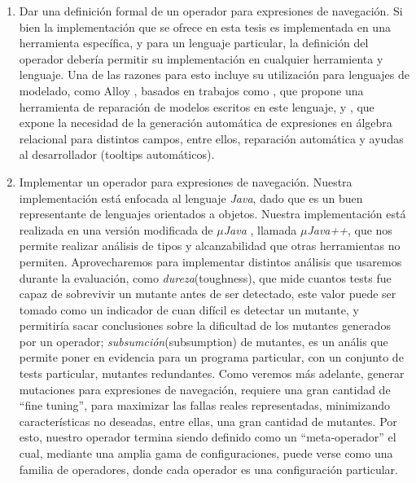 \begin{enumerate}
	\item Dar una definici\'on formal de un operador para expresiones de navegaci\'on. Si bien la implementaci\'on que se ofrece en esta tesis es implementada en una herramienta espec\'ifica, y para un lenguaje particular, la definici\'on del operador deber\'ia permitir su implementaci\'on en cualquier herramienta y lenguaje. Una de las razones para esto incluye su utilizaci\'on para lenguajes de modelado, como Alloy \cite{bibliography.books.SoftwareAbstractions-alloy}, basados en trabajos como \cite{bibliography.repair.mutation.AlloyWang18}, que propone una herramienta de reparaci\'on de modelos escritos en este lenguaje, y \cite{bibliography.algebraicExpressions.RexGenWang18}, que expone la necesidad de la generaci\'on autom\'atica de expresiones en \'algebra relacional para distintos campos, entre ellos, reparaci\'on autom\'atica y ayudas al desarrollador (tooltips autom\'aticos).
	
	\item Implementar un operador para expresiones de navegaci\'on. Nuestra implementaci\'on est\'a enfocada al lenguaje \emph{Java}, dado que es un buen representante de lenguajes orientados a objetos. Nuestra implementaci\'on est\'a realizada en una versi\'on modificada de \emph{$\mu$Java} \cite{bibliography.mutation.tools.muJavaMaOK05}, llamada \emph{$\mu$Java++}, que nos permite realizar an\'alisis de tipos y alcanzabilidad que otras herramientas no permiten. Aprovecharemos para implementar distintos an\'alisis que usaremos durante la evaluaci\'on, como \emph{dureza}(toughness), que mide cuantos tests fue capaz de sobrevivir un mutante antes de ser detectado, este valor puede ser tomado como un indicador de cuan dif\'icil es detectar un mutante, y permitir\'ia sacar conclusiones sobre la dificultad de los mutantes generados por un operador; \emph{subsumci\'on}(subsumption) de mutantes, es un an\'alis que permite poner en evidencia para un programa particular, con un conjunto de tests particular, mutantes redundantes. Como veremos m\'as adelante, generar mutaciones para expresiones de navegaci\'on, requiere una gran cantidad de ``fine tuning'', para maximizar las fallas reales representadas, minimizando caracter\'isticas no deseadas, entre ellas, una gran cantidad de mutantes. Por esto, nuestro operador termina siendo definido como un ``meta-operador'' el cual, mediante una amplia gama de configuraciones, puede verse como una familia de operadores, donde cada operador es una configuraci\'on particular.
\end{enumerate}

